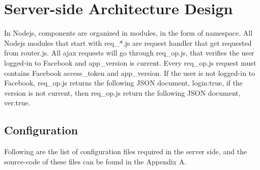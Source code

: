 \begin{itemize}
\end{itemize}


\section{Server-side Architecture Design}

In Nodejs, components are organized in modules, in the form of namespace. All Nodejs modules that start with req{\_}*.js are request handler that get requested from router.js. All ajax requests will go through req{\_}op.js, that verifies the user logged-in to Facebook and app{\_}version is current. Every req{\_}op.js request must contains Facebook access{\_}token and app{\_}version. If the user is not logged-in to Facebook, req{\_}op.js returns the following JSON document, {login:true}, if the version is not current, then req{\_}op.js return the following JSON document, {ver:true}. 

\subsection{Configuration}
Following are the list of configuration files required in the server side, and the source-code of these files can be found in the Appendix A.

